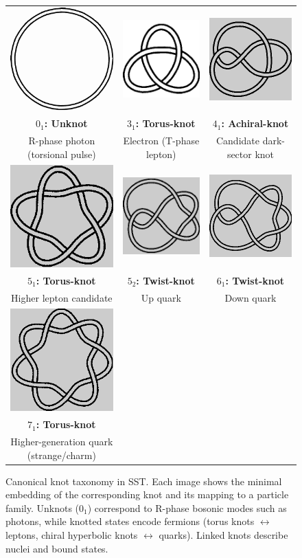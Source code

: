 \documentclass[10pt,reprint,aps,onecolumn,nofootinbib]{revtex4-2}
\begin{document}
        \begin{figure}[htbp]
        \centering
        \setlength{\tabcolsep}{8pt}
        \renewcommand{\arraystretch}{1.2}
        \begin{tabular}{ccc}
        \includegraphics[width=0.04\linewidth]{figures/0_1} &
        \includegraphics[width=0.04\linewidth]{figures/a3_1} &
        \includegraphics[width=0.04\linewidth]{figures/4_1} \\
        \textbf{$0_1$: Unknot} &
        \textbf{$3_1$: Torus-knot} &
        \textbf{$4_1$: Achiral-knot} \\
        \small R-phase photon (torsional pulse) &
        \small Electron (T-phase lepton) &
        \small Candidate dark-sector knot \\[4pt]
        \includegraphics[width=0.04\linewidth]{figures/5_1} &
        \includegraphics[width=0.04\linewidth]{figures/5_2} &
        \includegraphics[width=0.04\linewidth]{figures/6_1} \\
        \textbf{$5_1$: Torus-knot}&
        \textbf{$5_2$: Twist-knot}&
        \textbf{$6_1$: Twist-knot}\\
        \small Higher lepton candidate &
        \small Up quark &
        \small Down quark \\[4pt]
        \includegraphics[width=0.04\linewidth]{figures/7_1} & & \\
        \textbf{$7_1$: Torus-knot}  & & \\
        \small Higher-generation quark (strange/charm) & &
        \end{tabular}
        \caption{Canonical knot taxonomy in SST. Each image shows the minimal embedding of the corresponding knot and its mapping to a particle family. Unknots (0$_1$) correspond to R-phase bosonic modes such as photons, while knotted states encode fermions (torus knots $\leftrightarrow$ leptons, chiral hyperbolic knots $\leftrightarrow$ quarks). Linked knots describe nuclei and bound states.}
        \label{fig:knot-taxonomy}
        \end{figure}
\end{document}
